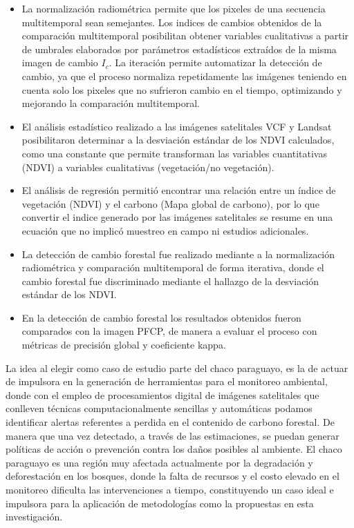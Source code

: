 \begin{itemize} 
\item La normalizaci\'on radiom\'etrica permite que los pixeles de una secuencia multitemporal sean semejantes. Los indices de cambios obtenidos de la comparaci\'on multitemporal posibilitan obtener variables cualitativas a partir de umbrales elaborados por par\'ametros estad\'isticos extra\'idos de la misma imagen de cambio $ I_{c} $. La iteraci\'on permite automatizar la detecci\'on de cambio, ya que el proceso normaliza repetidamente las im\'agenes teniendo en cuenta solo los pixeles que no sufrieron cambio en el tiempo, optimizando y mejorando la comparaci\'on multitemporal.
\item El an\'alisis estad\'istico realizado a las im\'agenes satelitales VCF y Landsat posibilitaron determinar a la desviaci\'on est\'andar de los NDVI calculados, como una constante que permite transforman las variables cuantitativas (NDVI) a variables cualitativas (vegetaci\'on/no vegetaci\'on).
\item El an\'alisis de regresi\'on permiti\'o encontrar una relaci\'on entre un \'indice de vegetaci\'on (NDVI) y el carbono (Mapa global de carbono), por lo que convertir el indice generado por las im\'agenes satelitales se resume en una ecuaci\'on que no implic\'o muestreo en campo ni estudios adicionales.
\item La detecci\'on de cambio forestal fue realizado mediante a la normalizaci\'on radiom\'etrica y comparaci\'on multitemporal de forma iterativa, donde el cambio forestal fue discriminado mediante el hallazgo de la desviaci\'on est\'andar de los NDVI. 
\item En la detecci\'on de cambio forestal los resultados obtenidos fueron comparados con la imagen PFCP, de manera a evaluar el proceso con m\'etricas de precisi\'on global y coeficiente kappa.
\end{itemize}
La idea al elegir como caso de estudio parte del chaco paraguayo, es la de actuar de impulsora en la generaci\'on de herramientas para el monitoreo ambiental, donde con el empleo de procesamientos digital de im\'agenes satelitales que conlleven t\'ecnicas computacionalmente sencillas y autom\'aticas podamos identificar alertas referentes a perdida en el contenido de carbono forestal. De manera que una vez detectado, a trav\'es de las estimaciones, se puedan generar pol\'iticas de acci\'on o prevenci\'on contra los da\~{n}os posibles al ambiente. El chaco paraguayo es una regi\'on muy afectada actualmente por la degradaci\'on y deforestaci\'on en los bosques, donde la falta de recursos y el costo  elevado en el monitoreo dificulta las intervenciones a tiempo, constituyendo un caso ideal e impulsora para la aplicaci\'on de metodolog\'ias como la propuestas en esta investigaci\'on.


